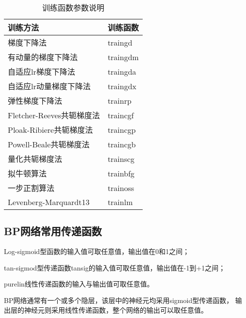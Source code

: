\begin{table}[ht]
	\centering
	\caption{训练函数参数说明}
	\label{tab:train}
	\begin{tabular}{@{}ll@{}}
		\toprule
		训练方法                  & 训练函数     \\ \midrule
		梯度下降法                 & traingd  \\
		有动量的梯度下降法             & traingdm \\
		自适应lr梯度下降法            & traingda \\
		自适应lr动量梯度下降法          & traingdx \\
		弹性梯度下降法               & trainrp  \\
		Fletcher-Reeves共轭梯度法  & traincgf \\
		Ploak-Ribiere共轭梯度法    & traincgp \\
		Powell-Beale共轭梯度法     & traincgb \\
		量化共轭梯度法               & trainscg \\
		拟牛顿算法                 & trainbfg \\
		一步正割算法                & trainoss \\
		Levenberg-Marquardt13 & trainlm  \\ \bottomrule
	\end{tabular}
\end{table}

\subsection{BP网络常用传递函数}

Log-sigmoid型函数的输入值可取任意值，输出值在0和1之间；

tan-sigmod型传递函数tansig的输入值可取任意值，输出值在-1到+1之间；

purelin线性传递函数的输入与输出值可取任意值。

BP网络通常有一个或多个隐层，该层中的神经元均采用sigmoid型传递函数，
输出层的神经元则采用线性传递函数，整个网络的输出可以取任意值。
